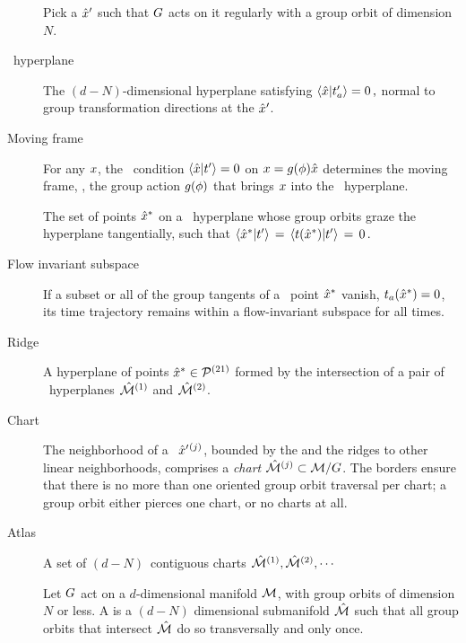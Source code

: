 \begin{description}

\item[\Template]
Pick a {\template} ${\hat{x}'}$ such that $G$ acts on it
regularly with a group orbit of dimension $N$.

\item[\Slice\ hyperplane]
The $(d\!-\!N)$-dimensional hyperplane satisfying
\( %
\braket{\sspRed}{\sliceTan{a}}=0
\,,
\) %
normal to group transformation directions at the {\template} ${\hat{x}'}$.

\item[Moving frame]
For any $x$, the \slice\ condition $\braket{\sspRed}{\sliceTan{}}=0$
on $x = g({\bf \phi})\hat{x}$ determines the moving frame, \ie, the
group action $g({\bf \phi})$ that brings $ x$ into the \slice\
hyperplane.

\item[\ChartBord]
The set of points $\hat{x}^\ast$ on a \slice\ hyperplane whose group orbits
graze the hyperplane tangentially, such that
$\braket{\sspRSing}{\sliceTan{}} \,=\,
\braket{\groupTan(\sspRSing)}{\sliceTan{}} \,=\, 0 \,.$

\item[Flow invariant subspace]
If a subset or all of the group tangents of a \chartBord\ point
$\hat{x}^\ast$ vanish, $t_a(\hat{x}^\ast)=0$, its time  trajectory
remains within a flow-invariant subspace for all times.

\item[Ridge]
A hyperplane of points $\hat{x}^* \in {\cal P}{}^{(21)}$ formed by the
intersection of a pair of \slice\ hyperplanes $\hat{\cal M}{}^{(1)}$ and
$\hat{\cal M}{}^{(2)}$.

\item[Chart]
The neighborhood of a \template\ ${\hat{x}'}{}^{(j)}$, bounded by the
{\chartBord} and the ridges to other linear neighborhoods, comprises
a \emph{chart} $\hat{\cal M}{}^{(j)} \subset {\cal M}/G$. The
borders ensure that there is no more than one oriented group orbit traversal per chart;
a group orbit either pierces one chart, or no charts at all.

\item[Atlas]
A set of $(d\!-\!N)$\dmn\ contiguous charts $\hat{\cal M}{}^{(1)},
\hat{\cal M}{}^{(2)}, \cdots$

\item[\Slice]
Let $G$ act on a $d$-dimensional manifold ${\cal M}$, with group
orbits of dimension $N$ or less. A \emph{\slice} is a $(d\!-\!N)$
dimensional submanifold $\hat{\cal M}$ such that all group orbits that
intersect $\hat{\cal M}$ do so transversally and only once.

\end{description}


